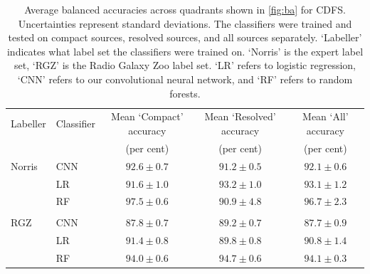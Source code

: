 \documentclass[fleqn,usenatbib,usedcolumn]{mnras}
\begin{document}
\begin{table}
  \caption{Average balanced accuracies across quadrants shown in
    \autoref{fig:ba} for CDFS. Uncertainties represent standard
    deviations. The classifiers were trained and tested on compact
    sources, resolved sources, and all sources separately. `Labeller'
    indicates what label set the classifiers were trained on. `Norris' is
    the expert label set, `RGZ' is the Radio Galaxy Zoo label set.%
    `LR' refers to logistic regression, `CNN' refers to our convolutional
    neural network, and `RF' refers to random forests.}
  \label{tab:average-accuracies}
  \begin{tabular}{llccc}
    \hline
    Labeller & Classifier & Mean `Compact' accuracy & Mean `Resolved' accuracy & Mean `All' accuracy\\
     & & (per cent) & (per cent) & (per cent)\\
    \hline
    Norris & CNN & $92.6 \pm 0.7$ & $91.2 \pm 0.5$ & $92.1 \pm 0.6$\\
     & LR & $91.6 \pm 1.0$ & $93.2 \pm 1.0$ & $93.1 \pm 1.2$\\
     & RF & $97.5 \pm 0.6$ & $90.9 \pm 4.8$ & $96.7 \pm 2.3$\\
     \\
    RGZ & CNN & $87.8 \pm 0.7$ & $89.2 \pm 0.7$ & $87.7 \pm 0.9$\\
     & LR & $91.4 \pm 0.8$ & $89.8 \pm 0.8$ & $90.8 \pm 1.4$\\
     & RF & $94.0 \pm 0.6$ & $94.7 \pm 0.6$ & $94.1 \pm 0.3$\\
    \hline
  \end{tabular}
\end{table}
\end{document}
